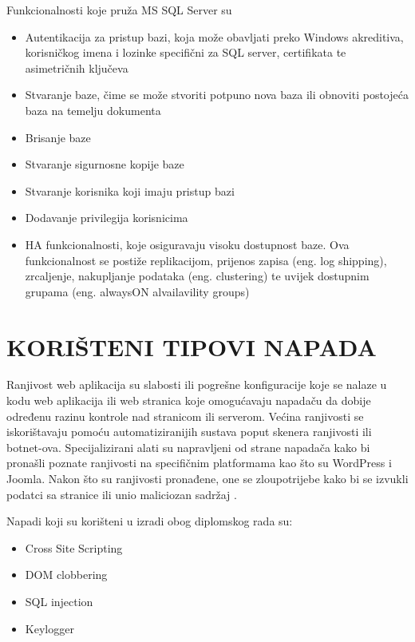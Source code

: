 \documentclass[12pt, oneside, onecolumn]{book}
\begin{document}
{Funkcionalnosti koje pruža MS SQL Server su \cite{mssql}

\begin{itemize}
\item Autentikacija za pristup bazi, koja može obavljati preko Windows akreditiva, korisničkog imena i lozinke specifični za SQL server, certifikata te asimetričnih ključeva
\item Stvaranje baze, čime se može stvoriti potpuno nova baza ili obnoviti postojeća baza na temelju dokumenta
\item Brisanje baze
\item Stvaranje sigurnosne kopije baze
\item Stvaranje korisnika koji imaju pristup bazi
\item Dodavanje privilegija korisnicima
\item HA funkcionalnosti, koje osiguravaju visoku dostupnost baze. Ova funkcionalnost se postiže replikacijom, prijenos zapisa (eng. log shipping), zrcaljenje, nakupljanje podataka (eng. clustering) te uvijek dostupnim grupama (eng. alwaysON alvailavility groups)
\end{itemize}

\chapter{KORIŠTENI TIPOVI NAPADA}
Ranjivost web aplikacija su slabosti ili pogrešne konfiguracije koje se nalaze u kodu web aplikacija ili web stranica koje omogućavaju napadaču da dobije određenu razinu kontrole nad stranicom ili serverom. Većina ranjivosti se iskorištavaju pomoću automatiziranijih sustava poput skenera ranjivosti ili botnet-ova. Specijalizirani alati su napravljeni od strane napadača kako bi pronašli poznate ranjivosti na specifičnim platformama kao što su WordPress i Joomla. Nakon što su ranjivosti pronađene, one se zloupotrijebe kako bi se izvukli podatci sa stranice ili unio maliciozan sadržaj \cite{ranj}.

Napadi koji su korišteni u izradi obog diplomskog rada su:

\begin{itemize}
\item Cross Site Scripting
\item DOM clobbering
\item SQL injection
\item Keylogger
\end{itemize}

}
\end{document}
